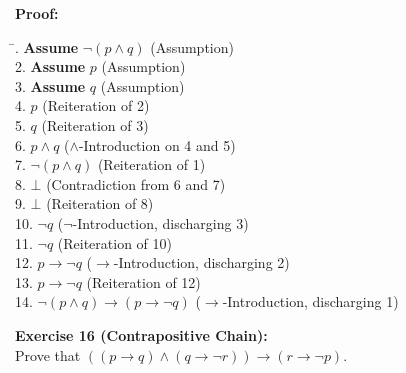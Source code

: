 \documentclass[12pt]{article}
\begin{document}
\textbf{Proof:}
\begin{tabbing}
\hspace*{2cm}\= . \quad \textbf{Assume } \(\lnot(p\land q)\) \quad (Assumption)\\[0.5em]
2. \quad \textbf{Assume } \(p\) \quad \quad \quad (Assumption)\\[0.5em]
3. \quad \textbf{Assume } \(q\) \quad \quad \quad (Assumption)\\[0.5em]
4. \quad \(p\) \quad \quad \quad (Reiteration of 2)\\[0.5em]
5. \quad \(q\) \quad \quad \quad (Reiteration of 3)\\[0.5em]
6. \quad \(p\land q\) \quad \quad (\(\land\)-Introduction on 4 and 5)\\[0.5em]
7. \quad \(\lnot(p\land q)\) \quad (Reiteration of 1)\\[0.5em]
8. \quad \(\bot\) \quad \quad \quad (Contradiction from 6 and 7)\\[0.5em]
9. \quad \(\bot\) \quad \quad \quad (Reiteration of 8)\\[0.5em]
10. \quad \(\lnot q\) \quad \quad (\(\lnot\)-Introduction, discharging 3)\\[0.5em]
11. \quad \(\lnot q\) \quad \quad (Reiteration of 10)\\[0.5em]
12. \quad \(p\to \lnot q\) \quad (\(\to\)-Introduction, discharging 2)\\[0.5em]
13. \quad \(p\to \lnot q\) \quad \quad (Reiteration of 12)\\[0.5em]
14. \quad \(\lnot(p\land q)\to (p\to \lnot q)\) \quad (\(\to\)-Introduction, discharging 1)
\end{tabbing}

\bigskip
\textbf{Exercise 16 (Contrapositive Chain):}\\[0.3em]
Prove that \(((p\to q)\land (q\to \lnot r))\to (r\to \lnot p)\).
\end{document}

